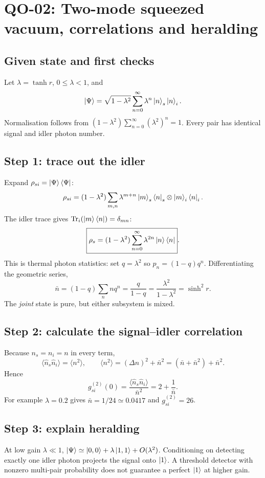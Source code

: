 
\section{QO-02: Two-mode squeezed vacuum, correlations and heralding}
\subsection*{Given state and first checks}
Let \(\lambda=\tanh r\), \(0\le\lambda<1\), and
\[
\left\lvert \Psi\right\rangle=\sqrt{1-\lambda^2}
\sum_{n=0}^\infty\lambda^n\left\lvert n\right\rangle_s\left\lvert n\right\rangle_i .
\]
Normalisation follows from
\((1-\lambda^2)\sum_{n=0}^\infty(\lambda^2)^n=1\).
Every pair has identical signal and idler photon number.

\subsection*{Step 1: trace out the idler}
Expand \(\rho_{si}=\left\lvert \Psi\right\rangle\left\langle \Psi\right\rvert\):
\[
\rho_{si}=(1-\lambda^2)\sum_{m,n}
\lambda^{m+n}\left\lvert m\right\rangle_s\left\langle n\right\rvert_s\otimes\left\lvert m\right\rangle_i\left\langle n\right\rvert_i.
\]
The idler trace gives
\(\operatorname{Tr}_i(\left\lvert m\right\rangle\left\langle n\right\rvert)=\delta_{mn}\):
\[
\boxed{\rho_s=(1-\lambda^2)\sum_{n=0}^\infty
\lambda^{2n}\left\lvert n\right\rangle\left\langle n\right\rvert}.
\]
This is thermal photon statistics: set \(q=\lambda^2\) so
\(p_n=(1-q)q^n\). Differentiating the geometric series,
\[
\bar n=(1-q)\sum_n nq^n=\frac{q}{1-q}
=\boxed{\frac{\lambda^2}{1-\lambda^2}=\sinh^2r}.
\]
The \emph{joint} state is pure, but either subsystem is mixed.

\subsection*{Step 2: calculate the signal--idler correlation}
Because \(n_s=n_i=n\) in every term,
\[
\langle\hat n_s\hat n_i\rangle=\langle n^2\rangle,\qquad
\langle n^2\rangle=(\Delta n)^2+\bar n^2
=(\bar n+\bar n^2)+\bar n^2.
\]
Hence
\[
\boxed{g_{si}^{(2)}(0)=
\frac{\langle\hat n_s\hat n_i\rangle}{\bar n^2}
=2+\frac{1}{\bar n}}.
\]
For example \(\lambda=0.2\) gives
\(\bar n=1/24\simeq0.0417\) and \(g_{si}^{(2)}=26\).

\subsection*{Step 3: explain heralding}
At low gain \(\lambda\ll1\),
\(\left\lvert \Psi\right\rangle\simeq\left\lvert 0,0\right\rangle+\lambda\left\lvert 1,1\right\rangle+O(\lambda^2)\).
Conditioning on detecting exactly one idler photon projects
the signal onto \(\left\lvert 1\right\rangle\). A threshold detector with nonzero
multi-pair probability does not guarantee a perfect \(\left\lvert 1\right\rangle\)
at higher gain.
